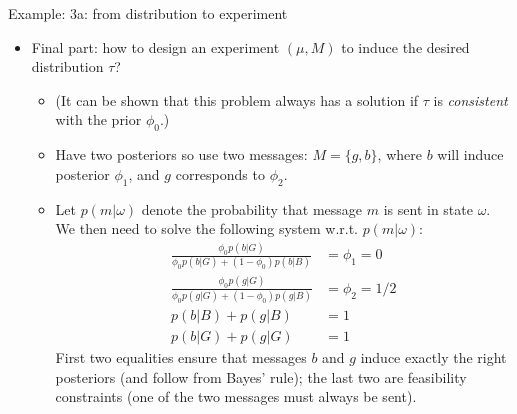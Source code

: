 \documentclass[english,10pt
,aspectratio=169
]{beamer}
\begin{document}
\begin{frame}{Example: 3a: from distribution to experiment}
\begin{itemize}
	\item Final part: how to design \alert{an experiment} $(\mu,M)$ to induce the desired distribution $\tau$? 
	\begin{itemize}
		\item (It can be shown that this problem always has a solution if $\tau$ is \emph{consistent} with the prior $\phi_0$.)
		\item Have two posteriors so use two messages: $M = \{g,b\}$, where $b$ will induce posterior $\phi_1$, and $g$ corresponds to $\phi_2$.
		\item Let $p(m|\omega)$ denote the probability that message $m$ is sent in state $\omega$. We then need to solve the following system w.r.t. $p(m|\omega)$:
		\begin{align*}
			\frac{\phi_0 p(b|G)}{\phi_0 p(b|G) + (1-\phi_0) p(b|B)} &= \phi_1 = 0
			\\
			\frac{\phi_0 p(g|G)}{\phi_0 p(g|G) + (1-\phi_0) p(g|B)} &= \phi_2 = 1/2
			\\
			p(b|B) + p(g|B) &= 1
			\\
			p(b|G) + p(g|G) &= 1
		\end{align*}
		First two equalities ensure that messages $b$ and $g$ induce exactly the right posteriors (and follow from Bayes' rule); the last two are feasibility constraints (one of the two messages must always be sent).
	\end{itemize}
\end{itemize}
\end{frame}
\end{document}
